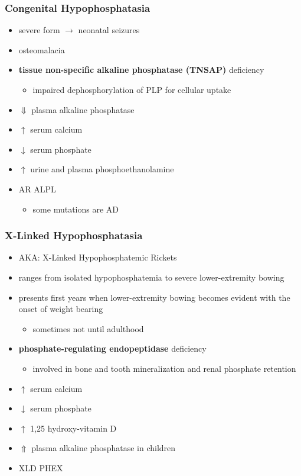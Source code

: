 \documentclass[12pt]{scrartcl}
\begin{document}
\subsubsection{Congenital Hypophosphatasia}
\label{sec:orgae69053}
\begin{itemize}
\item severe form \(\to\) neonatal seizures
\item osteomalacia
\item \textbf{tissue non-specific alkaline phosphatase (TNSAP)} deficiency
\begin{itemize}
\item impaired dephosphorylation of PLP for cellular uptake
\end{itemize}
\item \(\Downarrow\) plasma alkaline phosphatase
\item \(\uparrow\) serum calcium
\item \(\downarrow\) serum phosphate
\item \(\uparrow\) urine and plasma phosphoethanolamine
\item AR ALPL
\begin{itemize}
\item some mutations are AD
\end{itemize}
\end{itemize}

\subsubsection{X-Linked Hypophosphatasia}
\label{sec:orga18cc6d}
\begin{itemize}
\item AKA: X-Linked Hypophosphatemic Rickets
\item ranges from isolated hypophosphatemia to severe lower-extremity bowing
\item presents first  years when lower-extremity bowing becomes
evident with the onset of weight bearing
\begin{itemize}
\item sometimes not until adulthood
\end{itemize}
\item \textbf{phosphate-regulating endopeptidase} deficiency
\begin{itemize}
\item involved in bone and tooth mineralization and renal phosphate retention
\end{itemize}
\item \(\uparrow\) serum calcium
\item \(\downarrow\) serum phosphate
\item \(\uparrow\) 1,25 hydroxy-vitamin D
\item \(\Uparrow\) plasma alkaline phosphatase in children
\item XLD PHEX
\end{itemize}
\end{document}
